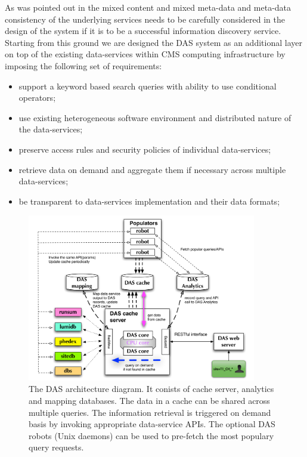 \documentclass[1p,times]{elsarticle}
\begin{document}
As was pointed out in \cite{Arms} the mixed content and 
mixed meta-data and meta-data consistency 
of the underlying services needs to be carefully
considered in the design of the system if it is to be a successful information 
discovery service.
Starting from this ground we are designed the DAS system as an
additional layer on top of the existing data-services
within CMS computing infrastructure by imposing the following set of requirements:
\begin{itemize}
\item support a keyword based search queries with ability to use conditional operators;
\item use existing heterogeneous software environment and distributed nature of the data-services;
\item preserve access rules and security policies of individual data-services;
\item retrieve data on demand and aggregate them if necessary across
multiple data-services;
\item be transparent to data-services implementation and their data formats;
\end{itemize}
\begin{figure}[htb]
\centering
\includegraphics[width=100mm]{DAS_Cache_and_Analytics.pdf}
\caption{
The DAS architecture diagram. It conists of cache server,
analytics and mapping databases. The data in a cache can be shared
across multiple queries. The information retrieval is triggered
on demand basis by invoking appropriate data-service APIs. The
optional DAS robots (Unix daemons) can be used to pre-fetch
the most populary query requests.
}
\label{DAS_cache}
\end{figure}
\end{document}
